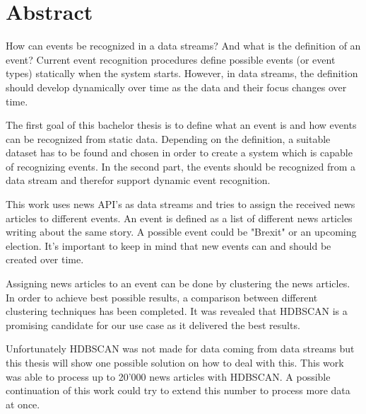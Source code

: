 
\section*{Abstract}

How can events be recognized in a data streams?
And what is the definition of an event?
Current event recognition procedures define possible events (or event types) statically when the system starts.
However, in data streams, the definition should develop dynamically over time as the data and their focus changes over time.

The first goal of this bachelor thesis is to define what an event is and how events can be recognized from static data.
Depending on the definition, a suitable dataset has to be found and chosen in order to create a system
which is capable of recognizing events.
In the second part, the events should be recognized from a data stream and therefor support dynamic event recognition.

This work uses news API's as data streams and tries to assign the received news articles to different events.
An event is defined as a list of different news articles writing about the same story.
A possible event could be "Brexit" or an upcoming election.
It's important to keep in mind that new events can and should be created over time.

Assigning news articles to an event can be done by clustering the news articles.
In order to achieve best possible results, a comparison between different clustering techniques has been completed.
It was revealed that HDBSCAN is a promising candidate for our use case as it delivered the best results.

Unfortunately HDBSCAN was not made for data coming from data streams but this thesis will show
one possible solution on how to deal with this.
This work was able to process up to 20'000 news articles with HDBSCAN.
A possible continuation of this work could try to extend this number to process more data at once.

